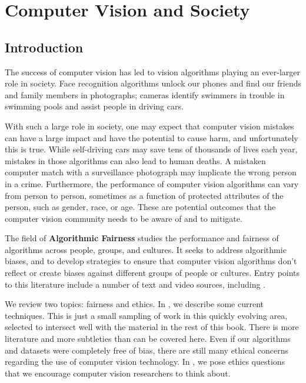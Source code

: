 \chapter{Computer Vision and Society}
\label{chapter:computer_vision_and_society}

 
\section{Introduction}

The success of computer vision has led to vision algorithms playing an
ever-larger role in society. Face recognition algorithms unlock
our phones and find our friends and family members in photographs;  cameras identify
swimmers in trouble in swimming pools and assist people in driving
cars.

With such a large role in society, one may expect that computer vision mistakes can
have a large impact and have the potential to cause harm, and
unfortunately this is true.  While self-driving cars may save tens of
thousands of lives each year, mistakes in those algorithms can also
lead to human deaths.  A mistaken computer match with a surveillance
photograph may implicate the wrong person in a crime.  Furthermore,
the performance of computer vision algorithms can vary from person to
person, sometimes as a function of protected attributes of the person, such as gender, race, or age.
These are potential outcomes that
the computer vision community needs to be aware of and to
mitigate.

The field of {\bf Algorithmic Fairness} studies the performance and fairness
of algorithms across people, groups, and cultures.  It seeks to
address algorithmic biases, and to develop strategies to ensure that computer vision algorithms don't reflect or create biases against different groups of people or cultures.
Entry points to this literature include a number of text and video sources, including \cite{Kearns2020,Gebru2020,Hamidi2018,Garvie2016,Hutchinson2019,Dwork2012,barocas-hardt-narayanan,Hardt2020}.  

We review two topics: fairness and ethics. 
In \sect{\ref{sect:fairness}}, we describe some current techniques.  This is just a small sampling of work in this quickly evolving area, selected to intersect well with the material in the rest of this book.  There is more literature and more subtleties than can be covered here. Even if our algorithms and datasets were completely free of bias, there are still many ethical concerns regarding the use of computer vision technology.
In \sect{\ref{sect:ethics}}, we pose ethics questions that we encourage computer vision researchers to think about.


